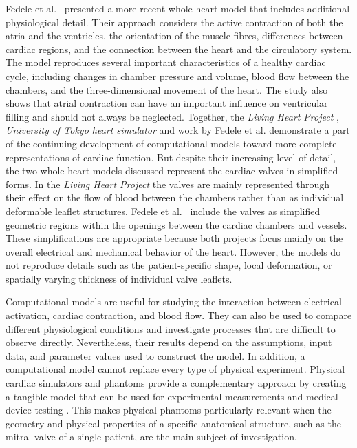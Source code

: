 Fedele et al.\ \cite{FEDELE2023115983} presented a more recent whole-heart model that includes additional physiological detail. Their approach considers the active contraction of both the atria and the ventricles, the orientation of the muscle fibres, differences between cardiac regions, and the connection between the heart and the circulatory system. The model reproduces several important characteristics of a healthy cardiac cycle, including changes in chamber pressure and volume, blood flow between the chambers, and the three-dimensional movement of the heart. The study also shows that atrial contraction can have an important influence on ventricular filling and should not always be neglected. Together, the \emph{Living Heart Project} \cite{BAILLARGEON201438}, \emph{University of Tokyo heart simulator} \cite{SUGIURA2012380} and work by Fedele et al. \cite{FEDELE2023115983} demonstrate a part of the continuing development of computational models toward more complete representations of cardiac function. But despite their increasing level of detail, the two whole-heart models discussed represent the cardiac valves in simplified forms. In the \emph{Living Heart Project} \cite{BAILLARGEON201438} the valves are mainly represented through their effect on the flow of blood between the chambers rather than as individual deformable leaflet structures. Fedele et al.\ \cite{FEDELE2023115983} include the valves as simplified geometric regions within the openings between the cardiac chambers and vessels. These simplifications are appropriate because both projects focus mainly on the overall electrical and mechanical behavior of the heart. However, the models do not reproduce details such as the patient-specific shape, local deformation, or spatially varying thickness of individual valve leaflets.

Computational models are useful for studying the interaction between electrical activation, cardiac contraction, and blood flow. They can also be used to compare different physiological conditions and investigate processes that are difficult to observe directly. Nevertheless, their results depend on the assumptions, input data, and parameter values used to construct the model. In addition, a computational model cannot replace every type of physical experiment. Physical cardiac simulators and phantoms provide a complementary approach by creating a tangible model that can be used for experimental measurements and medical-device testing \cite{lee2026ventricular}. This makes physical phantoms particularly relevant when the geometry and physical properties of a specific anatomical structure, such as the mitral valve of a single patient, are the main subject of investigation. 

